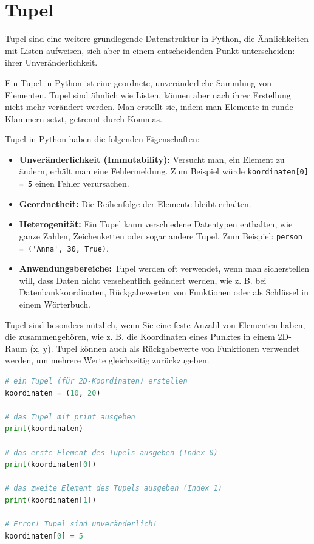 \section{Tupel}
Tupel sind eine weitere grundlegende Datenstruktur in Python, die Ähnlichkeiten mit Listen aufweisen, sich aber in einem entscheidenden Punkt unterscheiden: ihrer Unveränderlichkeit.

\begin{mydefinition}
	Ein Tupel in Python ist eine geordnete, unveränderliche Sammlung von Elementen.
	Tupel sind ähnlich wie Listen, können aber nach ihrer Erstellung nicht mehr verändert werden.
	Man erstellt sie, indem man Elemente in runde Klammern setzt, getrennt durch Kommas.
\end{mydefinition}

Tupel in Python haben die folgenden Eigenschaften:
\begin{itemize}
	\item \textbf{Unveränderlichkeit (Immutability):} Versucht man, ein Element zu ändern, erhält man eine Fehlermeldung. Zum Beispiel würde \lstinline|koordinaten[0] = 5| einen Fehler verursachen.
	\item \textbf{Geordnetheit:} Die Reihenfolge der Elemente bleibt erhalten.
	\item \textbf{Heterogenität:} Ein Tupel kann verschiedene Datentypen enthalten, wie ganze Zahlen, Zeichenketten oder sogar andere Tupel. Zum Beispiel: \lstinline|person = ('Anna', 30, True)|.
	\item \textbf{Anwendungsbereiche:} Tupel werden oft verwendet, wenn man sicherstellen will, dass Daten nicht versehentlich geändert werden, wie z. B. bei Datenbankkoordinaten, Rückgabewerten von Funktionen oder als Schlüssel in einem Wörterbuch.
\end{itemize}

Tupel sind besonders nützlich, wenn Sie eine feste Anzahl von Elementen haben, die zusammengehören, wie z. B. die Koordinaten eines Punktes in einem 2D-Raum (x, y). Tupel können auch als Rückgabewerte von Funktionen verwendet werden, um mehrere Werte gleichzeitig zurückzugeben.

\begin{myexample}
	\leavevmode
	\begin{lstlisting}[language=Python]
# ein Tupel (für 2D-Koordinaten) erstellen
koordinaten = (10, 20)

# das Tupel mit print ausgeben
print(koordinaten)

# das erste Element des Tupels ausgeben (Index 0)
print(koordinaten[0])

# das zweite Element des Tupels ausgeben (Index 1)
print(koordinaten[1])

# Error! Tupel sind unveränderlich!
koordinaten[0] = 5
\end{lstlisting}
\end{myexample}

